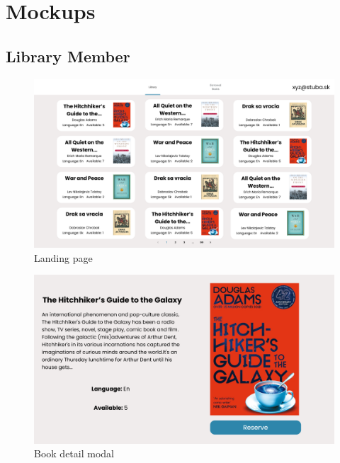 \documentclass[11pt,twoside,a4paper]{article}
\begin{document}
\pagebreak
\section{Mockups}

\subsection*{Library Member}

\begin{figure}[!ht]
    \includegraphics[scale=.2]{../mockups/Landing-page.png}
    \centering
    \caption{Landing page}
\end{figure}

\begin{figure}[!ht]
    \includegraphics[scale=.2]{../mockups/Book-detail-Modal.png}
    \centering
    \caption{Book detail modal}
\end{figure}
\end{document}

